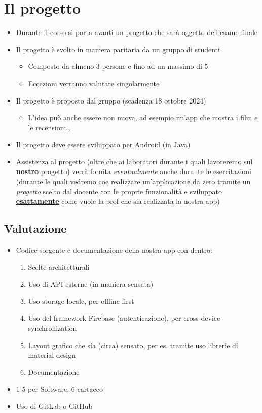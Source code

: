 \section{Il progetto}
\begin{itemize}
    \item Durante il corso si porta avanti un progetto che sarà oggetto dell'esame finale
    \item Il progetto è svolto in maniera paritaria da un gruppo di studenti
    \begin{itemize}
        \item Composto da almeno 3 persone e fino ad un massimo di 5
        \item Eccezioni verranno valutate singolarmente
    \end{itemize}
    \item Il progetto è proposto dal gruppo (scadenza 18 ottobre 2024)
    \begin{itemize}
        \item L'idea può anche essere non nuova, ad esempio un'app che mostra i film e le recensioni\dots
    \end{itemize}
    \item Il progetto deve essere sviluppato per Android (in Java)
    \item \underline{Assistenza al progetto} (oltre che ai laboratori durante i quali lavoreremo sul \textbf{nostro} progetto) verrà fornita \textit{eventualmente} anche durante le \underline{esercitazioni} (durante le quali vedremo coe realizzare un'applicazione da zero tramite un \textit{progetto} \underline{scelto dal docente} con le proprie funzionalità e sviluppato \textbf{\underline{esattamente}} come vuole la prof che sia realizzata la nostra app)
\end{itemize}

\subsection{Valutazione}
\begin{itemize}
    \item Codice sorgente e documentazione della nostra app con dentro:
    \begin{enumerate}
        \item Scelte architetturali
        \item Uso di API esterne (in maniera sensata)
        \item Uso storage locale, per offline-first
        \item Uso del framework Firebase (autenticazione), per cross-device synchronization
        \item Layout grafico che sia (circa) sensato, per es. tramite uso librerie di material design
        \item Documentazione
    \end{enumerate}
    \item 1-5 per Software, 6 cartaceo
    \item Uso di GitLab o GitHub
\end{itemize}

